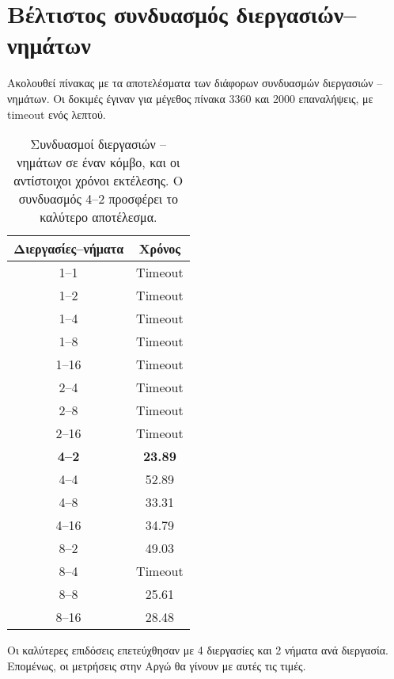 \section[Βέλτιστος συνδυασμός]{Βέλτιστος συνδυασμός διεργασιών--νημάτων}
Ακολουθεί πίνακας με τα αποτελέσματα των διάφορων συνδυασμών διεργασιών -- νημάτων. Οι δοκιμές έγιναν για μέγεθος πίνακα 3360 και 2000 επαναλήψεις, με timeout ενός λεπτού.
\begin{table}[H]
\centering
\begin{tabular}{| c | c | }
\hline
Διεργασίες--νήματα & Χρόνος \\
\hline
1--1 & Timeout \\
1--2 & Timeout \\
1--4 & Timeout \\
1--8 & Timeout \\
1--16 & Timeout \\
2--4 & Timeout \\
2--8 & Timeout \\
2--16 & Timeout \\
\textbf{4--2} & \textbf{23.89} \\
4--4 & 52.89 \\
4--8 & 33.31 \\
4--16 & 34.79 \\
8--2 & 49.03 \\
8--4 & Timeout \\
8--8 & 25.61 \\
8--16 & 28.48 \\
\hline
\end{tabular}
\caption{Συνδυασμοί διεργασιών -- νημάτων σε έναν κόμβο, και οι αντίστοιχοι χρόνοι εκτέλεσης. Ο συνδυασμός 4--2 προσφέρει το καλύτερο αποτέλεσμα.}
\label{tab:OpenMPOneNode}
\end{table}

Οι καλύτερες επιδόσεις επετεύχθησαν με 4 διεργασίες και 2 νήματα ανά διεργασία. Επομένως, οι μετρήσεις στην Αργώ θα γίνουν με αυτές τις τιμές.

